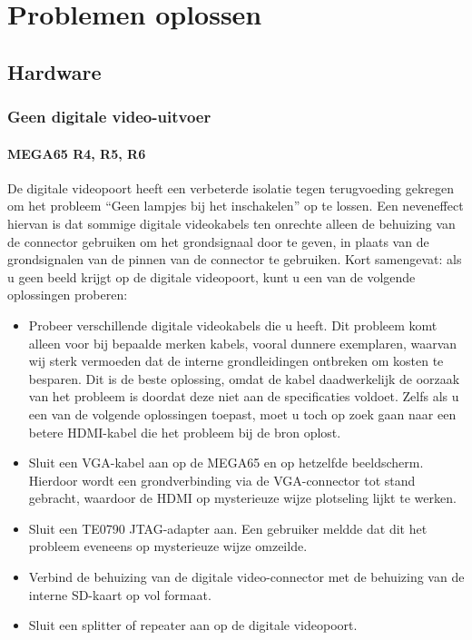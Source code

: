 \lstset{
    basicstyle=\small\ttfamily,    columns=flexible,    breaklines=true
}

\chapter{Problemen oplossen}

\section{Hardware}
    \subsection{Geen digitale video-uitvoer}

    \subsubsection{MEGA65 R4, R5, R6}
    De digitale videopoort heeft een verbeterde isolatie tegen terugvoeding gekregen om het probleem ``Geen lampjes bij het inschakelen'' op te lossen.  Een neveneffect hiervan is dat sommige digitale videokabels ten onrechte alleen de behuizing van de connector gebruiken om het grondsignaal door te geven, in plaats van de grondsignalen van de pinnen van de connector te gebruiken.  Kort samengevat: als u geen beeld krijgt op de digitale videopoort, kunt u een van de volgende oplossingen proberen:
    \begin{itemize}
    \item Probeer verschillende digitale videokabels die u heeft.  Dit probleem komt alleen voor bij bepaalde merken kabels, vooral dunnere exemplaren, waarvan wij sterk vermoeden dat de interne grondleidingen ontbreken om kosten te besparen. Dit is de beste oplossing, omdat de kabel daadwerkelijk de oorzaak van het probleem is doordat deze niet aan de specificaties voldoet. Zelfs als u een van de volgende oplossingen toepast, moet u toch op zoek gaan naar een betere HDMI-kabel die het probleem bij de bron oplost.    \item Sluit een VGA-kabel aan op de MEGA65 en op hetzelfde beeldscherm. Hierdoor wordt een grondverbinding via de VGA-connector tot stand gebracht, waardoor de HDMI op mysterieuze wijze plotseling lijkt te werken.    \item Sluit een TE0790 JTAG-adapter aan. Een gebruiker meldde dat dit het probleem eveneens op mysterieuze wijze omzeilde.    \item Verbind de behuizing van de digitale video-connector met de behuizing van de interne SD-kaart op vol formaat.    \item Sluit een splitter of repeater aan op de digitale videopoort.
    \end{itemize}

